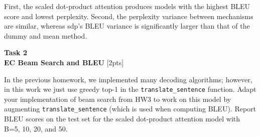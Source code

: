 \documentclass[12pt,article]{article}
\newenvironment{task}[2][Task]
    { \begin{mdframed}[backgroundcolor=gray!20] \textbf{#1 #2} \\}
    {  \end{mdframed}}
\begin{document}
First, the scaled dot-product attention produces models with the highest BLEU score and lowest perplexity. Second, the perplexity variance between mechanisms are similar, whereas sdp's BLEU variance is significantly larger than that of the dummy and mean method.
\begin{task}{2} 
\textbf{EC Beam Search and BLEU} [2pts]

In the previous homework, we implemented many decoding algorithms; however, in this work we just use greedy top-1 in the \texttt{translate\_sentence} function. Adapt your implementation of beam search from HW3 to work on this model by augmenting \texttt{translate\_sentence} (which is used when computing BLEU).  Report BLEU scores on the test set for the scaled dot-product attention model with B=5, 10, 20, and 50.
\end{task}



\end{document}
